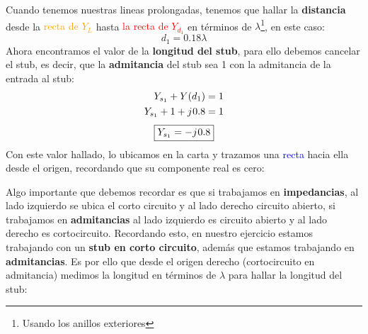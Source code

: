 \documentclass[
	12pt, %
	fleqn, %
	a4paper, %
	oneside, %
]{LegrandOrangeBook}
\begin{document}
\begin{example}
\begin{center}
\end{center}
Cuando tenemos nuestras lineas prolongadas, tenemos que hallar la \textbf{distancia} desde la \textcolor{orange}{recta de $Y_L$} hasta \textcolor{red}{la recta de $Y_{d_1}$} en términos de $\lambda$\footnote{Usando los anillos exteriores}, en este caso:
\begin{equation*}
\boxed{d_1=0.18\lambda}
\end{equation*}
Ahora encontramos el valor de la \textbf{longitud del stub}, para ello debemos cancelar el stub, es decir, que la \textbf{admitancia} del stub sea 1 con la admitancia de la entrada al stub:
\begin{align*}
Y_{s_1}+Y(d_1)&=1\\
Y_{s_1}+1+{j\mkern1mu} 0.8&=1
\end{align*}
\begin{equation*}
\boxed{Y_{s_1}=-{j\mkern1mu} 0.8}
\end{equation*}
Con este valor hallado, lo ubicamos en la carta y trazamos una \textcolor{blue}{recta} hacia ella desde el origen, recordando que su componente real es cero:
\begin{center}
\end{center}
Algo importante que debemos recordar es que si trabajamos en \textbf{impedancias}, al lado izquierdo se ubica el corto circuito y al lado derecho circuito abierto, si trabajamos en \textbf{admitancias} al lado izquierdo es circuito abierto y al lado derecho es cortocircuito. Recordando esto, en nuestro ejercicio estamos trabajando con un \textbf{stub en corto circuito}, además que estamos trabajando en \textbf{admitancias}. Es por ello que desde el origen derecho (cortocircuito en admitancia) medimos la longitud en términos de $\lambda$ para hallar la longitud del stub:

\end{example}
\end{document}
